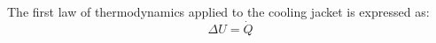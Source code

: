 The first law of thermodynamics applied to the cooling jacket is expressed as:  
\[
\Delta U = \dot{Q}
\]